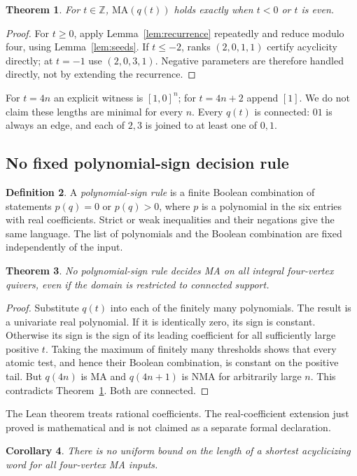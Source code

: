 \documentclass[11pt]{amsart}
\newtheorem{theorem}{Theorem}[section]
\newtheorem{corollary}[theorem]{Corollary}
\theoremstyle{definition}\newtheorem{definition}[theorem]{Definition}
\theoremstyle{remark}\newtheorem{remark}[theorem]{Remark}
\newcommand{\Z}{\mathbb Z}\newcommand{\N}{\mathbb N}
\newcommand{\MA}{\mathrm{MA}}\newcommand{\NMA}{\mathrm{NMA}}
\begin{document}
\begin{theorem}\label{thm:parity}
For $t\in\Z$, $\MA(q(t))$ holds exactly when $t<0$ or $t$ is even.
\end{theorem}
\begin{proof}
For $t\ge0$, apply Lemma~\ref{lem:recurrence} repeatedly and reduce modulo four, using Lemma~\ref{lem:seeds}. If $t\le-2$, ranks $(2,0,1,1)$ certify acyclicity directly; at $t=-1$ use $(2,0,3,1)$. Negative parameters are therefore handled directly, not by extending the recurrence.
\end{proof}
For $t=4n$ an explicit witness is $[1,0]^n$; for $t=4n+2$ append $[1]$. We do not claim these lengths are minimal for every $n$. Every $q(t)$ is connected: $01$ is always an edge, and each of $2,3$ is joined to at least one of $0,1$.

\subsection{No fixed polynomial-sign decision rule}
\begin{definition}
A \emph{polynomial-sign rule} is a finite Boolean combination of statements $p(q)=0$ or $p(q)>0$, where $p$ is a polynomial in the six entries with real coefficients. Strict or weak inequalities and their negations give the same language. The list of polynomials and the Boolean combination are fixed independently of the input.
\end{definition}
\begin{theorem}\label{thm:nogo}
No polynomial-sign rule decides MA on all integral four-vertex quivers, even if the domain is restricted to connected support.
\end{theorem}
\begin{proof}
Substitute $q(t)$ into each of the finitely many polynomials. The result is a univariate real polynomial. If it is identically zero, its sign is constant. Otherwise its sign is the sign of its leading coefficient for all sufficiently large positive $t$. Taking the maximum of finitely many thresholds shows that every atomic test, and hence their Boolean combination, is constant on the positive tail. But $q(4n)$ is MA and $q(4n+1)$ is NMA for arbitrarily large $n$. This contradicts Theorem~\ref{thm:parity}. Both are connected.
\end{proof}
The Lean theorem treats rational coefficients. The real-coefficient extension just proved is mathematical and is not claimed as a separate formal declaration.
\begin{corollary}
There is no uniform bound on the length of a shortest acyclicizing word for all four-vertex MA inputs.
\end{corollary}
\end{document}
